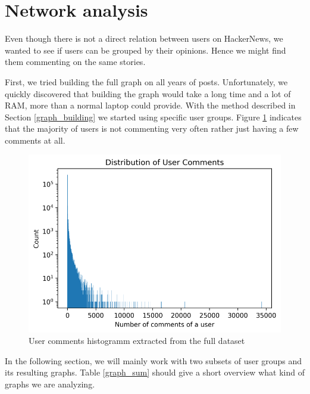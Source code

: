 \documentclass[sigconf]{acmart}
\begin{document}
\section{Network analysis}

Even though there is not a direct relation between users on HackerNews, we wanted to see if users can be grouped by their opinions.
Hence we might find them commenting on the same stories.

First, we tried building the full graph on all years of posts. Unfortunately, we quickly discovered that building the graph would take a long time and a lot of RAM, more than a normal laptop could provide. With the method described in Section \ref{graph_building} we started using specific user groups.
Figure \ref{fig:user_hist} indicates that the majority of users is not commenting very often rather just having a few comments at all.

\begin{figure}[h]
    \includegraphics[width=\textwidth / 2]{images/user_hist.png}
    \caption{User comments histogramm extracted from the full dataset}
    \label{fig:user_hist}
\end{figure}

In the following section, we will mainly work with two subsets of user groups and its resulting graphs.
Table \ref{graph_sum} should give a short overview what kind of graphs we are analyzing.
\end{document}
